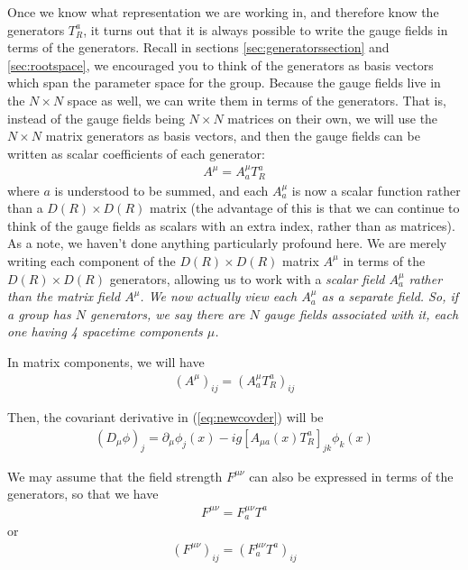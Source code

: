\documentclass[12pt,epsf]{article}
\def\nolabel{\nonumber }
\def\nolabel{\nonumber }
\begin{document}
Once we know what representation we are working in, and therefore know
the generators $T^a_R$, it turns out that it is always possible to
write the gauge fields in terms of the generators.  Recall in sections
\ref{sec:generatorssection} and \ref{sec:rootspace}, we encouraged you
to think of the generators as basis vectors which span the parameter
space for the group.  Because the gauge fields live in the $N\times N$
space as well, we can write them in terms of the generators.  That is,
instead of the gauge fields being $N\times N$ matrices on their own, we
will use the $N\times N$ matrix generators as basis vectors, and then
the gauge fields can be written as scalar coefficients of each
generator:
\begin{eqnarray}
A^{\mu} = A^{\mu}_aT^a_R \label{eq:thirdiwant}
\end{eqnarray}
where $a$ is understood to be summed, and each $A^{\mu}_a$ is now a
scalar function rather than a $D(R)\times D(R)$ matrix (the advantage
of this is that we can continue to think of the gauge fields as scalars
with an extra index, rather than as matrices).	As a note, we haven't
done anything particularly profound here.  We are merely writing each
component of the $D(R)\times D(R)$ matrix $A^{\mu}$ in terms of the
$D(R)\times D(R)$ generators, allowing us to work with a \it scalar \rm
field $A^{\mu}_a$ rather than the matrix field $A^{\mu}$.  We now
actually view each $A^{\mu}_a$ as a separate field.  So, if a group has
$N$ generators, we say there are $N$ gauge fields associated with it,
each one having 4 spacetime components $\mu$.  

In matrix components, we will have 
\begin{eqnarray}
(A^{\mu})_{ij} = (A^{\mu}_aT^a_R)_{ij}\nolabel
\end{eqnarray}

Then, the covariant derivative in (\ref{eq:newcovder}) will be
\begin{eqnarray}
(D_{\mu}\phi)_j = \partial_{\mu}\phi_j(x) -ig[A_{\mu
a}(x)T^a_R]_{jk}\phi_k(x) \label{eq:anothercovder}
\end{eqnarray}

We may assume that the field strength $F^{\mu\nu}$ can also be
expressed in terms of the generators, so that we have 
\begin{eqnarray}
F^{\mu \nu} = F^{\mu \nu}_aT^a \label{eq:fmnintermsofgen}
\end{eqnarray}
or
\begin{eqnarray}
(F^{\mu \nu})_{ij} = (F^{\mu \nu}_aT^a)_{ij}
\end{eqnarray}
\end{document}
